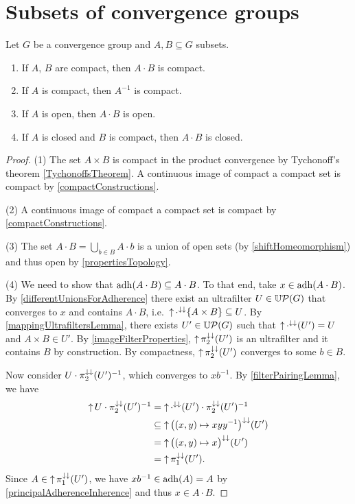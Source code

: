 \section{Subsets of convergence groups}
\begin{proposition}
Let $G$ be a convergence group and $A,B\subseteq G$ subsets.
\begin{enumerate} \label{compactSubsetsConvergenceGroups}
\item If $A$, $B$ are compact, then $A\cdot B$ is compact.
\item If $A$ is compact, then $A^{-1}$ is compact.
\item If $A$ is open, then $A\cdot B$ is open.
\item If $A$ is closed and $B$ is compact, then $A\cdot B$ is closed.
\end{enumerate}
\end{proposition}
\begin{proof}
(1) The set $A\times B$ is compact in the product convergence by Tychonoff's theorem \ref{TychonoffsTheorem}. A continuous image of compact a compact set is compact by \ref{compactConstructions}.

(2) A continuous image of compact a compact set is compact by \ref{compactConstructions}.

(3) The set $A\cdot B = \bigcup_{b\in B} A\cdot b$ is a union of open sets (by \ref{shiftHomeomorphism}) and thus open by \ref{propertiesTopology}.

(4) We need to show that $\operatorname{adh}(A\cdot B) \subseteq A\cdot B$. To that end, take $x\in \operatorname{adh}(A\cdot B)$. By \ref{differentUnionsForAdherence} there exist an ultrafilter $U\in \operatorname{\mathbb{U}\mathcal{P}}(G)$ that converges to $x$ and contains $A\cdot B$, i.e.\ $\operatorname{\uparrow}\cdot^{\downarrow\downarrow}\{A\times B\} \subseteq U$. By \ref{mappingUltrafiltersLemma}, there exists $U'\in \operatorname{\mathbb{U}\mathcal{P}}(G)$ such that $\operatorname{\uparrow}\cdot^{\downarrow\downarrow}(U') = U$ and $A\times B \in U'$. By \ref{imageFilterProperties}, $\operatorname{\uparrow} \pi_2^{\downarrow\downarrow}(U')$ is an ultrafilter and it contains $B$ by construction.
By compactness, $\operatorname{\uparrow} \pi_2^{\downarrow\downarrow}(U')$ converges to some $b\in B$.

Now consider $U\cdot \pi_2^{\downarrow\downarrow}(U')^{-1}$, which converges to $xb^{-1}$. By \ref{filterPairingLemma}, we have
\begin{align*}
\operatorname{\uparrow} U\cdot \pi_2^{\downarrow\downarrow}(U')^{-1} &= \operatorname{\uparrow}\cdot^{\downarrow\downarrow}(U')\cdot \pi_2^{\downarrow\downarrow}(U')^{-1} \\
&\subseteq \operatorname{\uparrow} \big((x,y)\mapsto xyy^{-1}\big)^{\downarrow\downarrow}(U') \\
&= \operatorname{\uparrow} \big((x,y)\mapsto x\big)^{\downarrow\downarrow}(U') \\
&= \operatorname{\uparrow} \pi_1^{\downarrow\downarrow}(U').
\end{align*}
Since $A\in \operatorname{\uparrow} \pi_1^{\downarrow\downarrow}(U')$, we have $xb^{-1}\in \operatorname{adh}(A) = A$ by \ref{principalAdherenceInherence} and thus $x\in A\cdot B$.
\end{proof}


